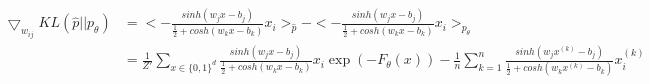 \documentclass[a4paper]{article}
\newcommand{\1}{\mathds{1}}
\begin{document}
\begin{align*}
\bigtriangledown_{w_{ij}}KL(\hat{p}||p_{\theta})&=<-\frac{sinh(w_jx-b_j)}{\frac{1}{2}+cosh(w_kx-b_k)}x_i>_{\hat{p}}-<-\frac{sinh(w_jx-b_j)}{\frac{1}{2}+cosh(w_kx-b_k)}x_i>_{p_{\theta}}\\
&=\frac{1}{Z'}\sum_{x\in\{0,1\}^d}\frac{sinh(w_jx-b_j)}{\frac{1}{2}+cosh(w_kx-b_k)}x_i\exp(-F_{\theta}(x))-\frac{1}{n}\sum_{k=1}^{n}\frac{sinh(w_jx^{(k)}-b_j)}{\frac{1}{2}+cosh(w_kx^{(k)}-b_k)}x^{(k)}_i\\
\end{align*}
\end{document}
